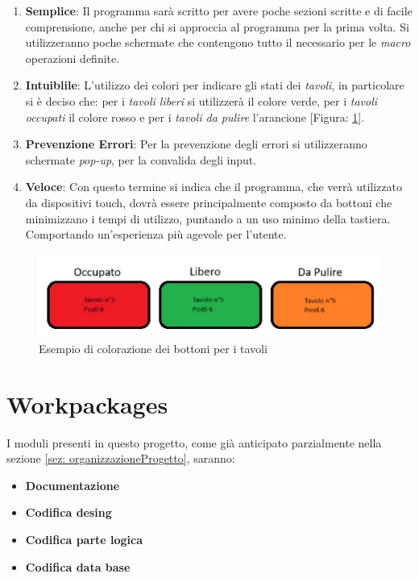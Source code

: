 \documentclass[12pt, letterpaper]{book}
\begin{document}
\begin{enumerate}
    \item \textbf{Semplice}: Il programma sarà scritto per avere poche sezioni scritte e di facile comprensione, anche per chi si approccia al programma per la prima volta. Si utilizzeranno poche schermate che contengono tutto il necessario per le \textit{macro} operazioni definite.
    \item \textbf{Intuiblile}: L'utilizzo dei colori per indicare gli stati dei \textit{tavoli}, in particolare si è deciso che: per i \textit{tavoli liberi} si utilizzerà il colore verde, per i \textit{tavoli occupati} il colore rosso e per i \textit{tavoli da pulire} l'arancione [Figura: \ref{fig: es_bottoni}].
    \item \textbf{Prevenzione Errori}: Per la prevenzione degli errori si utilizzeranno schermate \textit{pop-up}, per la convalida degli input.
    \item \textbf{Veloce}: Con questo termine si indica che il programma, che verrà utilizzato da dispositivi touch, dovrà essere principalmente composto da bottoni che minimizzano i tempi di utilizzo, puntando a un uso minimo della tastiera. Comportando un'esperienza più agevole per l'utente.
\end{enumerate}

\begin{figure}[h]
    \centering
    \includegraphics[width=0.6\linewidth]{Esempio_Bottoni.jpg}
    \caption{Esempio di colorazione dei bottoni per i tavoli}
    \label{fig: es_bottoni}
\end{figure}


\section{Workpackages}

I moduli presenti in questo progetto, come già anticipato parzialmente nella sezione \ref{sez: organizzazioneProgetto}, saranno:
\begin{itemize}
    \item \textbf{Documentazione}
    \item \textbf{Codifica desing}
    \item \textbf{Codifica parte logica}
    \item \textbf{Codifica data base}
\end{itemize}
\end{document}
